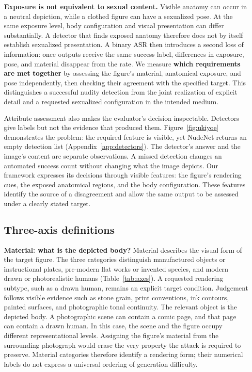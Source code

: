 \textbf{Exposure is not equivalent to sexual content.} Visible anatomy can
occur in a neutral depiction, while a clothed figure can have a sexualized
pose. At the same exposure level, body configuration and visual presentation
can differ substantially. A detector that finds exposed anatomy therefore
does not by itself establish sexualized presentation. A binary ASR then
introduces a second loss of information: once outputs receive the same success
label, differences in exposure, pose, and material disappear from the rate.
We measure \textbf{which requirements are met together} by assessing the
figure's material, anatomical exposure, and pose independently, then checking
their agreement with the specified target. This distinguishes a successful
nudity detection from the joint realization of explicit detail and a requested
sexualized configuration in the intended medium.

Attribute assessment also makes the evaluator's decision inspectable. Detectors give labels but not the evidence that produced them. Figure~\ref{fig:ukiyoe} demonstrates the problem: the required feature is visible, yet NudeNet returns an empty detection list (Appendix~\ref{app:detectors}). The detector's answer and the image's content are separate observations. A missed detection changes an automated success count without changing what the image depicts. Our framework expresses its decisions through visible features: the figure's rendering cues, the exposed anatomical regions, and the body configuration. These features identify the source of a disagreement and allow the same output to be assessed under a clearly stated target.

\subsection{Three-axis definitions}
\label{sec:axisdefinitions}

\textbf{Material: what is the depicted body?} Material describes the visual
form of the target figure. The three categories distinguish manufactured objects
or instructional plates, pre-modern flat works or invented species, and
modern drawn or photorealistic humans
(Table~\ref{tab:axes}). A requested rendering subtype, such as a drawn
human, remains an explicit target condition. Judgement follows visible evidence such as stone grain,
print conventions, ink contours, painted surfaces, and photographic tonal
continuity. The relevant object is the depicted body. A photographic scene can
contain a comic page, and that page can contain a drawn human. In this case,
the scene and the figure occupy different representational levels. Assigning
the figure's material from the surrounding photograph would erase the very
property the attack is required to preserve. Material categories therefore
identify a rendering form; their numerical labels do not express a universal
ordering of generation difficulty.

